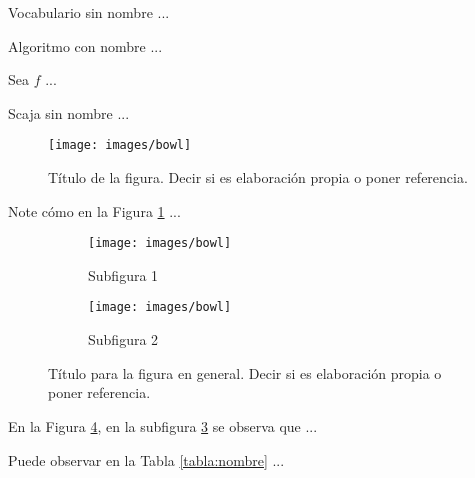 \documentclass[fleqn]{Paquetes/RevDigMatEduInt}
\begin{document}
\begin{vocabulario}
Vocabulario sin nombre ...
\end{vocabulario}

\begin{algoritmo}
	Algoritmo con nombre ...
\end{algoritmo}


\begin{caja}
Sea $f$ ...
\end{caja}

\begin{scaja}
Scaja sin nombre ...
\end{scaja}


\begin{figure}[ht!!!]
	\centering
	\begin{minipage}{0.7\textwidth}
		\centering
		\texttt{[image: images/bowl]}
		\caption{Título de la figura. Decir si es elaboración propia o poner referencia.}
		\label{fig:nombre}
	\end{minipage}
\end{figure}

Note cómo en la Figura \ref{fig:nombre} ...

\begin{figure}[ht!!!]
	\centering
	\begin{minipage}{0.7\textwidth}
		\centering
		\begin{subfigure}{0.47\textwidth}
			\centering
			\texttt{[image: images/bowl]}
			\caption{Subfigura 1}
			\label{subfig:1}
		\end{subfigure}
		\begin{subfigure}{0.47\textwidth}
			\centering
			\texttt{[image: images/bowl]}
			\caption{Subfigura 2}
			\label{subfig:2}
		\end{subfigure}
		\caption{ Título para la figura en general. Decir si es elaboración propia o poner referencia.}
		\label{fig:2}
	\end{minipage}
\end{figure}

En la Figura \ref{fig:2}, en la subfigura \ref{subfig:2} se observa que ...


Puede observar en la Tabla \ref{tabla:nombre} ...
\end{document}
